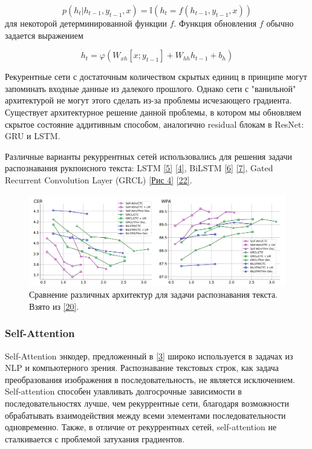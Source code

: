 \begin{equation}
	p(h_t | h_{t-1}, y_{t-1}, x) = \mathbb{I}(h_t = f (h_{t-1}, y_{t-1}, x)) 
\end{equation}
для некоторой детерминированной функции $f$. Функция обновления $f$ обычно задается выражением

\begin{equation}
	h_t = \varphi (W_{xh} [x; y_{t-1}] + W_{hh}h_{t-1} + b_h) 
\end{equation}

Рекурентные сети с достаточным количеством скрытых единиц в принципе могут запоминать входные данные из далекого прошлого. Однако сети с "ванильной" архитектурой не могут этого сделать из-за проблемы исчезающего градиента. Существует архитектурное решение данной проблемы, в котором мы обновляем скрытое состояние аддитивным способом, аналогично residual блокам в ResNet: GRU и LSTM.

Различные варианты рекуррентных сетей использовались для решения задачи распознавания рукпоисного текста: LSTM \hyperlink{cite.Bas14}{[5]} \hyperlink{cite.Gra08}{[4]}, BiLSTM \hyperlink{cite.The17}{[6]} \hyperlink{cite.Joa17}{[7]}, Gated Recurrent Convolution Layer (GRCL) \hyperlink{image4}{[Рис 4]} \hyperlink{cite.Lux17}{[22]}.

\begin{figure}
    \centering
    \includegraphics[scale=0.25]{./images/competition.png}
    \caption{\protect\hypertarget{image5}{Сравнение различных архитектур для задачи распознавания текста. \\ Взято из \protect\hyperlink{cite.Her21}{[20]}}.}
\end{figure}

\subsubsection{Self-Attention}
Self-Attention энкодер, предложенный в \hyperlink{cite.Vas17}{[3]} широко используется в задачах из NLP и компьютерного зрения. Распознавание текстовых строк, как задача преобразования изображения в последовательность, не является исключением. Self-attention способен улавливать долгосрочные зависимости в последовательностях лучше, чем рекуррентные сети, благодаря возможности обрабатывать взаимодействия между всеми элементами последовательности одновременно. Также, в отличие от рекуррентных сетей, self-attention не сталкивается с проблемой затухания градиентов.

